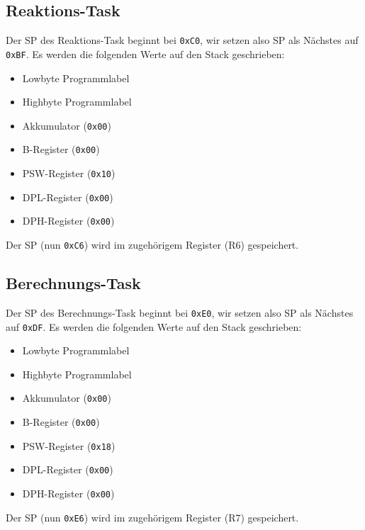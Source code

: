 \subsection{Reaktions-Task}
Der SP des Reaktions-Task beginnt bei \verb|0xC0|, wir setzen also SP als Nächstes auf \verb|0xBF|.
Es werden die folgenden Werte auf den Stack geschrieben:
\begin{itemize}
    \item Lowbyte Programmlabel
    \item Highbyte Programmlabel
    \item Akkumulator (\verb|0x00|)
    \item B-Register (\verb|0x00|)
    \item PSW-Register (\verb|0x10|)
    \item DPL-Register (\verb|0x00|)
    \item DPH-Register (\verb|0x00|)
\end{itemize}
Der SP (nun \verb|0xC6|) wird im zugehörigem Register (R6) gespeichert.

\subsection{Berechnungs-Task}
Der SP des Berechnungs-Task beginnt bei \verb|0xE0|, wir setzen also SP als Nächstes auf \verb|0xDF|.
Es werden die folgenden Werte auf den Stack geschrieben:
\begin{itemize}
    \item Lowbyte Programmlabel
    \item Highbyte Programmlabel
    \item Akkumulator (\verb|0x00|)
    \item B-Register (\verb|0x00|)
    \item PSW-Register (\verb|0x18|)
    \item DPL-Register (\verb|0x00|)
    \item DPH-Register (\verb|0x00|)
\end{itemize}
Der SP (nun \verb|0xE6|) wird im zugehörigem Register (R7) gespeichert.
